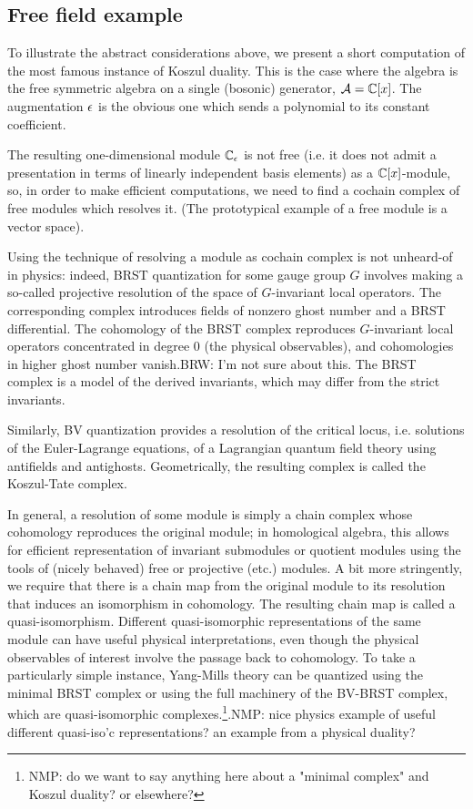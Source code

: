 \documentclass[11pt]{amsart}
\def\brian#1{{\textcolor{blue!65!red}{BRW: {#1}}}}
\def\natalie#1{{\textcolor{green!65!black}{NMP: {#1}}}}
\begin{document}
\subsection{Free field example} 

To illustrate the abstract considerations above, we present a short computation of the most famous instance of Koszul duality. 
This is the case where the algebra is the free symmetric algebra on a single (bosonic) generator, $\mathcal A = \mathbb C[x]$. 
The augmentation $\epsilon$ is the obvious one which sends a polynomial to its constant coefficient. 

The resulting one-dimensional module $\mathbb C_{\epsilon}$ is not free (i.e. it does not admit a presentation in terms of linearly independent basis elements) as a $\mathbb C[x]$-module, so, in order to make efficient computations, we need to find a cochain complex of free modules which resolves it. (The prototypical example of a free module is a vector space). 

Using the technique of resolving a module as cochain complex is not unheard-of in physics: indeed, BRST quantization for some gauge group $G$ involves making a so-called projective resolution of the space of $G$-invariant local operators. 
The corresponding complex introduces fields of nonzero ghost number and a BRST differential. 
The cohomology of the BRST complex reproduces $G$-invariant local operators concentrated in degree 0 (the physical observables), and cohomologies in higher ghost number vanish.\brian{I'm not sure about this. 
The BRST complex is a model of the derived invariants, which may differ from the strict invariants.
}

Similarly, BV quantization provides a resolution of the critical locus, i.e. solutions of the Euler-Lagrange equations, of a Lagrangian quantum field theory using antifields and antighosts. Geometrically, the resulting complex is called the Koszul-Tate complex. 

In general, a resolution of some module is simply a chain complex whose cohomology reproduces the original module; in homological algebra, this allows for efficient representation of invariant submodules or quotient modules using the tools of (nicely behaved) free or projective (etc.) modules. 
A bit more stringently, we require that there is a chain map from the original module to its resolution that induces an isomorphism in cohomology. 
The resulting chain map is called a quasi-isomorphism. 
Different quasi-isomorphic representations of the same module can have useful physical interpretations, even though the physical observables of interest involve the passage back to cohomology. 
To take a particularly simple instance, Yang-Mills theory can be quantized using the minimal BRST complex or using the full machinery of the BV-BRST complex, which are quasi-isomorphic complexes.\footnote{\natalie{do we want to say anything here about a "minimal complex" and Koszul duality? or elsewhere?}}.\natalie{nice physics example of useful different quasi-iso'c representations? an example from a physical duality?} 
\end{document}
